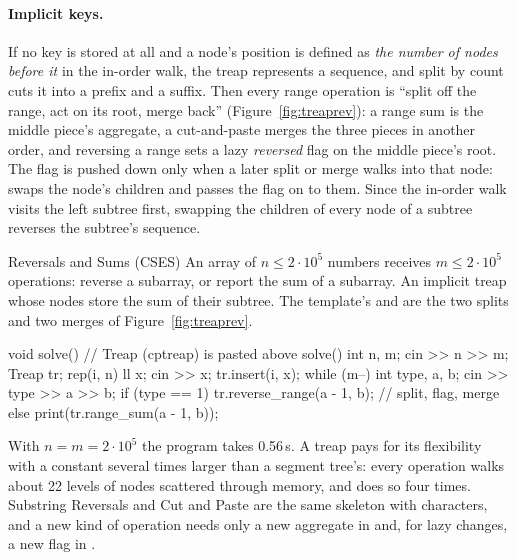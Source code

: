 \paragraph{Implicit keys.} If no key is stored at all and a node's position is defined as \emph{the number of nodes before it} in the
in-order walk, the treap represents a sequence, and split by count cuts it into a prefix and a suffix. Then every range operation is
``split off the range, act on its root, merge back'' (Figure~\ref{fig:treaprev}): a range sum is the middle piece's aggregate, a
cut-and-paste merges the three pieces in another order, and reversing a range sets a lazy \emph{reversed} flag on the middle piece's
root. The flag is pushed down only when a later split or merge walks into that node:  swaps the node's children and passes
the flag on to them. Since the in-order walk visits the left subtree first, swapping the children of every node of a subtree reverses
the subtree's sequence.

\begin{problem}{Reversals and Sums (CSES)}
An array of $n \le 2 \cdot 10^5$ numbers receives $m \le 2 \cdot 10^5$ operations: reverse a subarray, or report the sum of a
subarray.
\solution An implicit treap whose nodes store the sum of their subtree. The template's  and  are the
two splits and two merges of Figure~\ref{fig:treaprev}.
\end{problem}

\begin{code}
void solve() {  // Treap (cptreap) is pasted above solve()
    int n, m;
    cin >> n >> m;
    Treap tr;
    rep(i, n) {
        ll x;
        cin >> x;
        tr.insert(i, x);
    }
    while (m--) {
        int type, a, b;
        cin >> type >> a >> b;
        if (type == 1) tr.reverse_range(a - 1, b);  // split, flag, merge
        else print(tr.range_sum(a - 1, b));
    }
}
\end{code}


With $n = m = 2 \cdot 10^5$ the program takes 0.56\,s. A treap pays for its flexibility with a constant several times larger than a
segment tree's: every operation walks about 22 levels of nodes scattered through memory, and does so four times. Substring Reversals
and Cut and Paste are the same skeleton with characters, and a new kind of operation needs only a new aggregate in  and,
for lazy changes, a new flag in .

